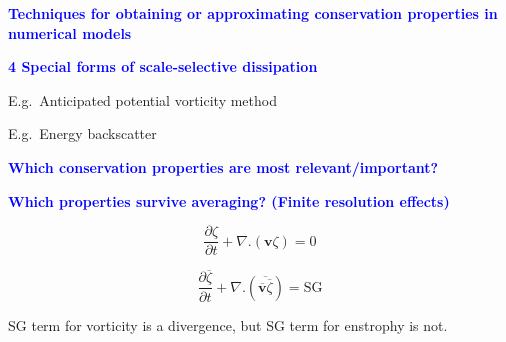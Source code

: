 \documentclass[a4]{seminar}
\newcommand{\B}[1]{\textcolor{blue}{#1}}
\begin{document}
\begin{slide}

\B{\bf Techniques for obtaining or approximating conservation
properties in numerical models}

\vspace{3mm}

\B{\bf 4 Special forms of scale-selective dissipation}

\vspace{3mm}

E.g.\ Anticipated potential vorticity method

\vspace{3mm}

E.g.\ Energy backscatter

\end{slide}


\begin{slide}

\B{\bf Which conservation properties are most relevant/important?}

\vspace{2mm}

\B{\bf Which properties survive averaging? (Finite resolution effects)}


\begin{displaymath}
\frac{\partial \zeta}{\partial t}
+
\nabla . (\mathbf{v} \zeta)
=0
\end{displaymath}

\begin{displaymath}
\frac{\partial \overline{\zeta}}{\partial t}
+
\nabla . (\overline{\overline{\mathbf{v}} \overline{\zeta}})
= \mathrm{SG}
\end{displaymath}


SG term for vorticity is a divergence, but SG term for
enstrophy is not.


\end{slide}

\end{document}

